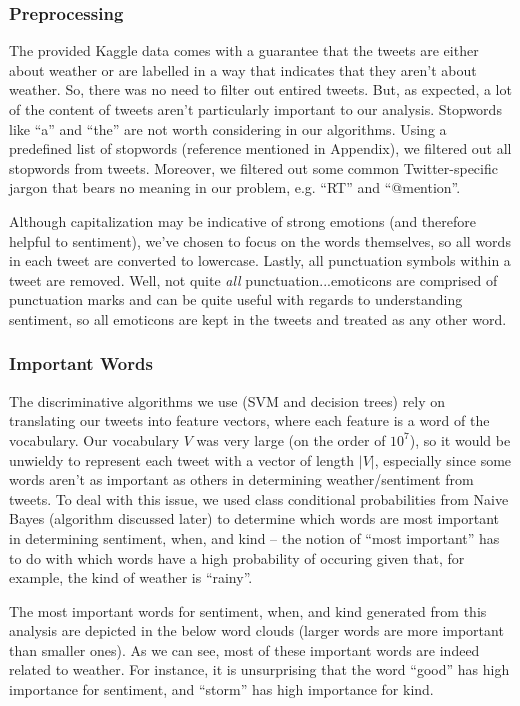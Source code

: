 \subsubsection{Preprocessing}
	The provided Kaggle data comes with a guarantee that the tweets are either about weather or are labelled in a way that indicates that they aren't about weather. So, there was no need to filter out entired tweets. But, as expected, a lot of the content of tweets aren't particularly important to our analysis. Stopwords like ``a'' and ``the'' are not worth considering in our algorithms. Using a predefined list of stopwords (reference mentioned in Appendix), we filtered out all stopwords from tweets. Moreover, we filtered out some common Twitter-specific jargon that bears no meaning in our problem, e.g. ``RT'' and ``@mention''.
	
	 Although capitalization may be indicative of strong emotions (and therefore helpful to sentiment), we've chosen to focus on the words themselves, so all words in each tweet are converted to lowercase. Lastly, all  punctuation symbols within a tweet are removed. Well, not quite \emph{all} punctuation...emoticons are comprised of punctuation marks and can be quite useful with regards to understanding sentiment, so all emoticons are kept in the tweets and treated as any other word.



\subsubsection{Important Words}
	The discriminative algorithms we use (SVM and decision trees) rely on translating our tweets into feature vectors, where each feature is a word of the vocabulary. Our vocabulary $V$ was very large (on the order of $10^7$), so it would be unwieldy to represent each tweet with a vector of length $|V|$, especially since some words aren't as important as others in determining weather/sentiment from tweets. To deal with this issue, we used class conditional probabilities from Naive Bayes (algorithm discussed later) to determine which words are most important in determining sentiment, when, and kind -- the notion of ``most important'' has to do with which words have a high probability of occuring given that, for example, the kind of weather is ``rainy''.

	The most important words for sentiment, when, and kind generated from this analysis are depicted in the below word clouds (larger words are more important than smaller ones). As we can see, most of these important words are indeed related to weather. For instance, it is unsurprising that the word ``good'' has high importance for sentiment, and ``storm'' has high importance for kind.


